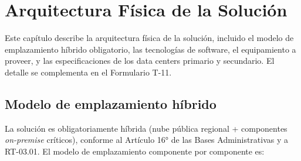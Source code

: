\chapter{Arquitectura Física de la Solución}
\label{sec:arqfisica}

Este capítulo describe la arquitectura física de la solución, incluido el modelo de
emplazamiento híbrido obligatorio, las tecnologías de software, el equipamiento a
proveer, y las especificaciones de los data centers primario y secundario. El detalle se
complementa en el Formulario T-11.

\section{Modelo de emplazamiento híbrido}

La solución es obligatoriamente híbrida (nube pública regional + componentes
\emph{on-premise} críticos), conforme al Artículo 16° de las Bases Administrativas y a
RT-03.01. El modelo de emplazamiento componente por componente es:


